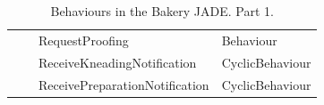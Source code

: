 \documentclass{beamer}
\begin{document}
\begin{frame}
\begin{table}[h!]
\begin{tabular}{llll}
					\cmidrule(l){3-4}
					
					{} & {} & RequestProofing & Behaviour \\
					
					\cmidrule(l){3-4}
					
					{} & {} & ReceiveKneadingNotification & CyclicBehaviour \\
					
					\cmidrule(l){3-4}
					
					{} & {} & ReceivePreparationNotification & CyclicBehaviour \\
					
					
					\bottomrule
				\end{tabular}
				\caption{Behaviours in the Bakery JADE. Part 1.} 
				\label{table-behaviours1}
			\end{table}
		\end{frame}
		
\end{document}
